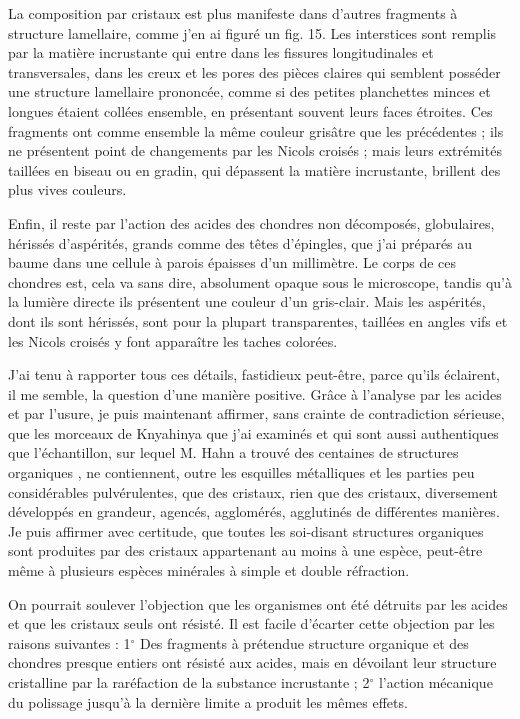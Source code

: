 \documentclass[a4paper, 12pt, oneside, french]{book}
\begin{document}
La composition par cristaux est plus manifeste dans d'autres fragments à structure lamellaire, comme j'en ai figuré un fig. 15. Les interstices sont remplis par la matière incrustante qui entre dans les fissures longitudinales et transversales, dans les creux et les pores des pièces claires qui semblent posséder une structure lamellaire prononcée, comme si des petites planchettes minces et longues étaient collées ensemble, en présentant souvent leurs faces étroites. Ces fragments ont comme ensemble la même couleur grisâtre que les précédentes ; ils ne présentent point de changements par les Nicols croisés ; mais leurs extrémités taillées en biseau ou en gradin, qui dépassent la matière incrustante, brillent des plus vives couleurs.

Enfin, il reste par l'action des acides des chondres non décomposés, globulaires, hérissés d'aspérités, grands comme des têtes d'épingles, que j'ai préparés au baume dans une cellule à parois épaisses d'un millimètre. Le corps de ces chondres est, cela va sans dire, absolument opaque sous le microscope, tandis qu'à la lumière directe ils présentent une couleur d'un gris-clair. Mais les aspérités, dont ils sont hérissés, sont pour la plupart transparentes, taillées en angles vifs et les Nicols croisés y font apparaître les taches colorées.

J'ai tenu à rapporter tous ces détails, fastidieux peut-être, parce qu'ils éclairent, il me semble, la question d'une manière positive. Grâce à l'analyse par les acides et par l'usure, je puis maintenant affirmer, sans crainte de contradiction sérieuse, que les morceaux de Knyahinya que j'ai examinés et qui sont aussi authentiques que l'échantillon, sur lequel M. Hahn a trouvé \og des centaines de structures organiques \fg, ne contiennent, outre les esquilles métalliques et les parties peu considérables pulvérulentes, que des cristaux, rien que des cristaux, diversement développés en grandeur, agencés, agglomérés, agglutinés de différentes manières. Je puis affirmer avec certitude, que toutes les soi-disant structures organiques sont produites par des cristaux appartenant au moins à une espèce, peut-être même à plusieurs espèces minérales à simple et double réfraction.

On pourrait soulever l'objection que les organismes ont été détruits par les acides et que les cristaux seuls ont résisté. Il est facile d'écarter cette objection par les raisons suivantes : 1$^{\circ}$ Des fragments à prétendue structure organique et des chondres presque entiers ont résisté aux acides, mais en dévoilant leur structure cristalline par la raréfaction de la substance incrustante ; 2$^{\circ}$ l'action mécanique du polissage jusqu'à la dernière limite a produit les mêmes effets.
\end{document}
